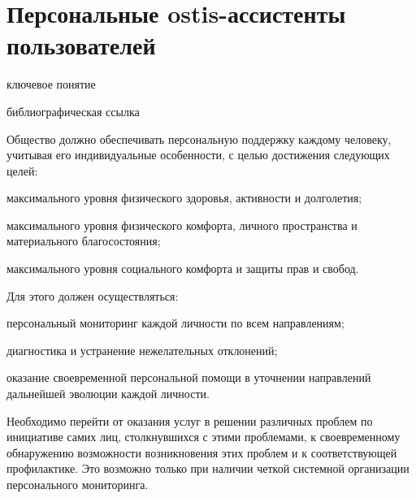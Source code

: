 \section{Персональные ostis-ассистенты пользователей}
{\label{sec_ostis_assistant}} 

\begin{SCn}

\begin{scnrelfromlist}{ключевое понятие}
\end{scnrelfromlist}

\begin{scnrelfromlist}{библиографическая ссылка}
\end{scnrelfromlist}

\end{SCn}

Общество должно обеспечивать персональную поддержку каждому человеку, учитывая его индивидуальные особенности, с целью достижения следующих целей:
\begin{textitemize}
    \item максимального уровня физического здоровья, активности и долголетия;
    \item максимального уровня физического комфорта, личного пространства и материального благосостояния;
    \item максимального уровня социального комфорта и защиты прав и свобод.
\end{textitemize}

Для этого должен осуществляться:
\begin{textitemize}
    \item персональный мониторинг каждой личности по всем направлениям;
    \item диагностика и устранение нежелательных отклонений;
    \item оказание своевременной персональной помощи в уточнении направлений дальнейшей эволюции каждой личности.
\end{textitemize}

Необходимо перейти от оказания услуг в решении различных проблем по инициативе самих лиц, столкнувшихся с этими проблемами, к своевременному обнаружению возможности возникновения этих проблем и к соответствующей профилактике. 
Это возможно только при наличии четкой системной организации персонального мониторинга. 

